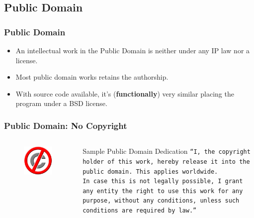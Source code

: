 \documentclass{beamer}
\begin{document}
\subsection{Public Domain}
\begin{frame}
\frametitle{Public Domain}

\begin{itemize}
\item An intellectual work in the \alert{Public Domain}
  is neither under any IP law nor a license. 
\item Most public domain works retains the authorship. 
\item \alert{With source code} available, it's (\textbf{functionally}) \alert{very similar} placing the program under a \alert{BSD license}.
\end{itemize}

\end{frame}


\begin{frame}
\frametitle{Public Domain: No Copyright}

\begin{columns}

\column[t]{2.5cm}

\begin{figure}
\vspace{0.2cm}
\begin{flushleft}
	\includegraphics[scale=0.3,clip=true]{figs/no-copyright-public-domain.jpg}
\end{flushleft}
\end{figure}

\column[t]{8cm}
\vspace{-0.5cm}
\begin{block}{Sample Public Domain Dedication}
\texttt{``I, the copyright holder of this work, hereby release it into the public domain. This applies worldwide.} \\
\medskip
\texttt{In case this is not legally possible, I grant any entity the right to use this work for any purpose, without any conditions, unless such conditions are required by law.''}
\end{block}

\end{columns}


\end{frame}
\end{document}

